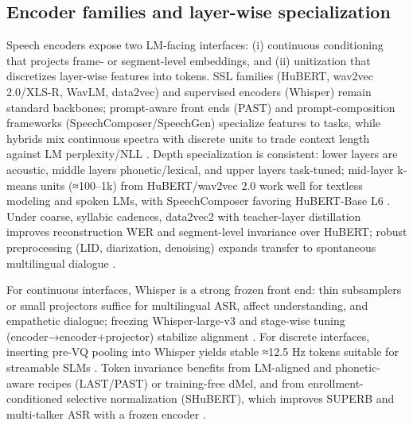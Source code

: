 \documentclass{article}
\begin{document}
\subsection{Encoder families and layer-wise specialization} \label{subsec:Encoder families and layer-wise specialization}
Speech encoders expose two LM-facing interfaces: (i) continuous conditioning that projects frame- or segment-level embeddings, and (ii) unitization that discretizes layer-wise features into tokens. SSL families (HuBERT, wav2vec 2.0/XLS-R, WavLM, data2vec) and supervised encoders (Whisper) remain standard backbones; prompt-aware front ends (PAST) and prompt-composition frameworks (SpeechComposer/SpeechGen) specialize features to tasks, while hybrids mix continuous spectra with discrete units to trade context length against LM perplexity/NLL \cite{har-tuv2025pastphoneticacousticspeechtokenizer,wu2024speechcomposerunifyingmultiplespeechtask,wu2023speechgenunlockinggenerativepowerspeechl,verma2024whispergpthybridrepresentationaudiolarge}. Depth specialization is consistent: lower layers are acoustic, middle layers phonetic/lexical, and upper layers task-tuned; mid-layer k-means units (≈100–1k) from HuBERT/wav2vec 2.0 work well for textless modeling and spoken LMs, with SpeechComposer favoring HuBERT-Base L6 \cite{hsu2024exploringcontextlearningtextlessspeechla,wu2024speechcomposerunifyingmultiplespeechtask}. Under coarse, syllabic cadences, data2vec2 with teacher-layer distillation improves reconstruction WER and segment-level invariance over HuBERT; robust preprocessing (LID, diarization, denoising) expands transfer to spontaneous multilingual dialogue \cite{baade2024syllablelmlearningcoarsesemanticunitsspe,nakata2024jchatjapaneselargescalespokendialoguecor}.

For continuous interfaces, Whisper is a strong frozen front end: thin subsamplers or small projectors suffice for multilingual ASR, affect understanding, and empathetic dialogue; freezing Whisper-large-v3 and stage-wise tuning (encoder→encoder+projector) stabilize alignment \cite{wang2024blspemotowardsempatheticlargespeechlangu,li2025transsionmultilingualspeechrecognitionsy,nguyen2025qwenvsgemmaintegrationwhispercomparative}. For discrete interfaces, inserting pre-VQ pooling into Whisper yields stable ≈12.5 Hz tokens suitable for streamable SLMs \cite{zeng2024scalingspeechtextpretrainingsyntheticint}. Token invariance benefits from LM-aligned and phonetic-aware recipes (LAST/PAST) or training-free dMel, and from enrollment-conditioned selective normalization (SHuBERT), which improves SUPERB and multi-talker ASR with a frozen encoder \cite{turetzky2024lastlanguagemodelawarespeechtokenization,har-tuv2025pastphoneticacousticspeechtokenizer,bai2025dmelspeechtokenizationmadesimple,entry2025selectivehubertselfsupervisedpretraining}.
\end{document}
